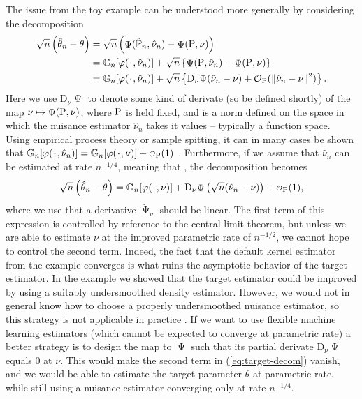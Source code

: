 \documentclass[a4,danish]{article}
\DeclareMathOperator{\TT}{\Psi}
\begin{document}
  The issue from the toy example can be understood more generally by
  considering the decomposition
\begin{align*}
  \sqrt{n}
  \left(
  \hat{\theta}_n - \theta
  \right)
  & =  \sqrt{n}
    \left(
    \TT(\empmeas,\hat{\nu}_n) - \TT(\P,\nu)
    \right) \\
  & =
    \G{\phi( \blank, \hat{\nu}_n)}
    + \sqrt{n}
    \left\{
    \TT(\P,\hat{\nu}_n) - \TT(\P,\nu)
    \right\}
  \\
  & = \G{\phi( \blank, \hat{\nu}_n)}
    + \sqrt{n}
    \left\{
    \mathrm{D}_{\nu}{\TT}(\hat{\nu}_n - \nu)
    + \mathcal{O}_{\P}(\Vert \hat{\nu}_n - \nu \Vert^2)
    \right\}.
\end{align*}
Here we use $\mathrm{D}_{\nu}{\TT}$ to denote some kind of derivate (so be defined shortly) of the
map $\nu \mapsto \TT(\P, \nu)$, where $\P$ is held fixed, and  is a norm defined on the space in which the
nuisance estimator $\hat{\nu}_n$ takes it values -- typically a function space. Using empirical
process theory or sample spitting, it can in many cases be shown that $\G{\phi( \blank, \hat{\nu}_n)} = \G{\phi( \blank, \nu)} + \smallO_{\P}(1)$
\citep{van1996weak,van2000asymptotic,chernozhukov2018double}. Furthermore, if we assume that
$\hat{\nu}_n$ can be estimated at rate $n^{-1/4}$, meaning that  , the decomposition becomes
\begin{equation}
  \label{eq:target-decom}
  \sqrt{n}
  \left(
    \hat{\theta}_n - \theta
  \right)
  = \G{\phi( \blank, \nu)}
  + \mathrm{D}_{\nu}{\TT}
  \left(
    \sqrt{n}(\hat{\nu}_n - \nu)
  \right)
  + \smallO_{\P}(1),
\end{equation}
where we use that a derivative $\dot{\TT}_{\nu}$ should be linear. The
first term of this expression is controlled by reference to the
central limit theorem, but unless we are able to estimate $\nu$ at the
improved parametric rate of $n^{-1/2}$, we cannot hope to control the
second term. Indeed, the fact that the default kernel estimator from
the example converges  is what
ruins the asymptotic behavior of the target estimator.  In the example
we showed that the target estimator could be improved by using a
suitably undersmoothed density estimator. However, we would not in
general know how to choose a properly undersmoothed nuisance
estimator, so this strategy is not applicable in practice . If we want to use flexible
machine learning estimators (which cannot be expected to converge at
parametric rate) a better strategy is to design the map to $\TT$ such
that its partial derivate $\mathrm{D}_{\nu}{\TT}$ equals 0 at
$\nu$. This would make the second term in (\ref{eq:target-decom})
vanish, and we would be able to estimate the target parameter $\theta$
at parametric rate, while still using a nuisance estimator converging
only at rate $n^{-1/4}$.
\end{document}
